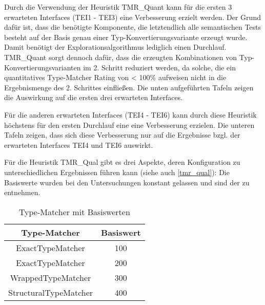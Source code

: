 Durch die Verwendung der Heuristik TMR\_Quant kann für die ersten 3 erwarteten Interfaces (TEI1 - TEI3) eine Verbesserung erzielt werden. Der Grund dafür ist, dass die benötigte Komponente, die letztendlich alle semantischen Tests besteht auf der Basis genau einer Typ-Konvertierungsvariante erzeugt wurde. Damit benötigt der Explorationsalgorithmus lediglich einen Durchlauf. TMR\_Quant sorgt dennoch dafür, dass die erzeugten Kombinationen von Typ-Konvertierungsvarianten im 2. Schritt reduziert werden, da solche, die ein quantitatives Type-Matcher Rating von < 100\% aufweisen nicht in die Ergebnismenge des 2. Schrittes einfließen. Die unten aufgeführten Tafeln zeigen die Auswirkung auf die ersten drei erwarteten Interfaces.\newpage
\begin{multicols}{3}
\columnbreak
{}\columnbreak
{}
\end{multicols}
\noindent
Für die anderen erwarteten Interfaces (TEI4 - TEI6) kann durch diese Heuristik höchstens für den ersten Durchlauf eine eine Verbesserung erzielen. Die unteren Tafeln zeigen, dass sich diese Verbesserung nur auf die Ergebnisse bzgl. der erwarteten Interfaces TEI4 und TEI6 auswirkt.
\begin{multicols}{3}
\columnbreak
{}\columnbreak
{}
\end{multicols}
Für die Heuristik TMR\_Qual gibt es drei Aspekte, deren Konfiguration zu unterschiedlichen Ergebnissen führen kann (siehe auch \ref{tmr_qual}):
Die Basiswerte wurden bei den Untersuchungen konstant gelassen und sind der  zu entnehmen. 
\begin{table}[H]
\centering
\small
			\begin{tabular}[c]{|c|c|}
			\hline
			\hline
				 \textbf{Type-Matcher} & \textbf{Basiswert} \\
				\hline\hline
				ExactTypeMatcher & 100 \\
				\hline
				ExactTypeMatcher & 200\\
				\hline
				WrappedTypeMatcher & 300\\
				\hline
				StructuralTypeMatcher & 400\\
				\hline
				\hline
			\end{tabular} 
 \caption{Type-Matcher mit Basiswerten
}
 \label{tab:basevalues}
\end{table}
